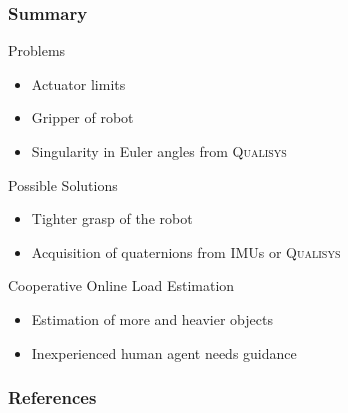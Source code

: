\documentclass[student,noshadow]{ITRslides}
\begin{document}
\begin{frame}
	\frametitle{Summary}
	\begin{block}{Problems}
		\begin{itemize}
			\item Actuator limits
			\item Gripper of robot
			\item Singularity in Euler angles from \textsc{Qualisys}
		\end{itemize}	   
	\end{block}	
	\begin{block}{Possible Solutions}
		\begin{itemize}
			\item Tighter grasp of the robot
			\item Acquisition of quaternions from IMUs or \textsc{Qualisys}
		\end{itemize}  
	\end{block}	
	\begin{block}{Cooperative Online Load Estimation}
		\begin{itemize}
			\item Estimation of more and heavier objects
			\item Inexperienced human agent needs guidance
		\end{itemize}
	\end{block}	
\end{frame}

\appendix
\begin{frame}
	\frametitle{References}
	\printbibliography
\end{frame}
\end{document}
